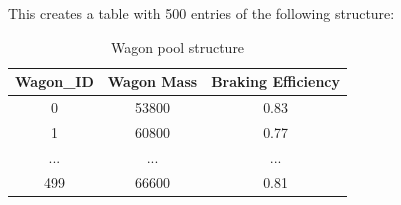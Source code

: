 \noindent
This creates a table with 500 entries of the following structure:

\bigskip
\begin{table}[H]
	\label{tab:wagonpool}
	\centering
	\begin{tabular}{c|c|c}
		Wagon\_ID & Wagon Mass & Braking Efficiency \\
		\hline
		0 & 53800 & 0.83 \\
		\hline
		1 & 60800 & 0.77 \\
		\hline
		... & ... & ... \\
		\hline
		499 & 66600 & 0.81 \\
	\end{tabular}
	\caption{Wagon pool structure}
\end{table}

\bigskip

